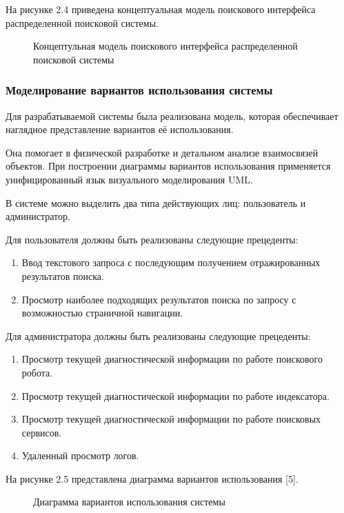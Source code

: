 На рисунке 2.4 приведена концептуальная модель поискового интерфейса распределенной поисковой системы.

\begin{figure}[H]
\caption{Концептульная модель поискового интерфейса распределенной поисковой системы}
\label{concept_searcher_model:image}
\end{figure}

\subsubsection{Моделирование вариантов использования системы}

Для разрабатываемой системы была реализована модель, которая обеспечивает наглядное представление вариантов её использования.

Она помогает в физической разработке и детальном анализе взаимосвязей объектов. При построении диаграммы вариантов использования применяется унифицированный язык визуального моделирования UML.

В системе можно выделить два типа действующих лиц: пользователь и администратор. 

Для пользователя должны быть реализованы следующие прецеденты:
\begin{enumerate}
\item Ввод текстового запроса с последующим получением отражированных результатов поиска.
\item Просмотр наиболее подходящих результатов поиска по запросу с возможностью страничной навигации.
\end{enumerate}

Для администратора должны быть реализованы следующие прецеденты:
\begin{enumerate}
\item Просмотр текущей диагностической информации по работе поискового робота.
\item Просмотр текущей диагностической информации по работе индексатора.
\item Просмотр текущей диагностической информации по работе  поисковых сервисов.
\item Удаленный просмотр логов.
\end{enumerate}

На рисунке 2.5 представлена диаграмма вариантов использования [5].

\begin{figure}[H]
\caption{Диаграмма вариантов использования системы}
\label{diagram_usecases:image}
\end{figure}

